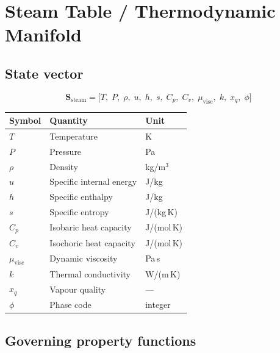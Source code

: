 \documentclass[11pt, a4paper, oneside]{article}
\begin{document}
\section{Steam Table / Thermodynamic Manifold}
\label{sec:steam}

\subsection{State vector}

\begin{equation}
  \mathbf{S}_{\mathrm{steam}}
  = \bigl[T,\; P,\; \rho,\; u,\; h,\; s,\; C_p,\; C_v,\;
           \mu_{\mathrm{visc}},\; k,\; x_q,\; \phi\bigr]
  \label{eq:steam_state}
\end{equation}

\begin{center}
\begin{tabular}{lll}
  \toprule
  Symbol & Quantity & Unit \\
  \midrule
  $T$             & Temperature           & K \\
  $P$             & Pressure              & Pa \\
  $\rho$          & Density               & kg/m$^3$ \\
  $u$             & Specific internal energy & J/kg \\
  $h$             & Specific enthalpy     & J/kg \\
  $s$             & Specific entropy      & J/(kg\,K) \\
  $C_p$           & Isobaric heat capacity & J/(mol\,K) \\
  $C_v$           & Isochoric heat capacity & J/(mol\,K) \\
  $\mu_{\mathrm{visc}}$ & Dynamic viscosity & Pa\,s \\
  $k$             & Thermal conductivity  & W/(m\,K) \\
  $x_q$           & Vapour quality        & --- \\
  $\phi$          & Phase code            & integer \\
  \bottomrule
\end{tabular}
\end{center}

\subsection{Governing property functions}
\end{document}

